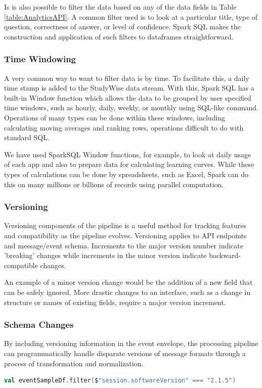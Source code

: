 \documentclass[runningheads,a4paper]{llncs}
\begin{document}
Is is also possible to filter the data based on any of the data fields in Table \ref{table:AnalyticsAPI}.  A common filter used is to look at a particular title, type of question, correctness of answer, or level of confidence.  Spark SQL makes the construction and application of such filters to dataframes straightforward.
 
\subsubsection{Time Windowing}

A very common way to want to filter data is by time.  To facilitate this, a daily time stamp is added to the StudyWise data stream.  With this, Spark SQL has a built-in Window function which allows the data to be grouped by user specified time windows, such as hourly, daily, weekly, or monthly using SQL-like command.  Operations of many types can be done within these windows, including calculating moving averages and ranking rows, operations difficult to do with standard SQL.  

We have used SparkSQL Window functions, for example, to look at daily usage of each app and also to prepare data for calculating learning curves.  While these types of calculations can be done by spreadsheets, such as Excel, Spark can do this on many millions or billions of records using parallel computation.

\subsubsection{Versioning}
Versioning components of the pipeline is a useful method for tracking features and compatibility as the pipeline evolves. Versioning applies to API endpoints and message/event schema. Increments to the major version number indicate 'breaking' changes while increments in the minor version indicate backward-compatible changes.

An example of a minor version change would be the addition of a new field that can be safely ignored. More drastic changes to an interface, such as a change in structure or names of existing fields, require a major version increment.

\subsubsection{Schema Changes}

By including versioning information in the event envelope, the processing pipeline can programmatically handle disparate versions of message formats through a process of transformation and normalization.
\begin{lstlisting}[language=Scala, basicstyle = \small, caption={Filtering events based on a specific software or message version.}]
  val eventSampleDf.filter($"session.softwareVersion" === "2.1.5")
\end{lstlisting}
\end{document}
